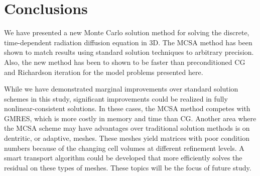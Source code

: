 \documentclass[preprint,12pt]{elsarticle}
\begin{document}
\section{Conclusions}
\label{sec:conclusions}

We have presented a new Monte Carlo solution method for solving the
discrete, time-dependent radiation diffusion equation in 3D.  The MCSA
method has been shown to match results using standard solution
techniques to arbitrary precision.  Also, the new method has been to
shown to be faster than preconditioned CG and Richardson iteration for
the model problems presented here.

While we have demonstrated marginal improvements over standard
solution schemes in this study, significant improvements could be
realized in fully nonlinear-consistent solutions.  In these cases, the
MCSA method competes with GMRES, which is more costly in memory and
time than CG.  Another area where the MCSA scheme may have advantages
over traditional solution methods is on dentritic, or adaptive,
meshes.  These meshes yield matrices with poor condition numbers
because of the changing cell volumes at different refinement levels.
A smart transport algorithm could be developed that more efficiently
solves the residual on these types of meshes.  These topics will be
the focus of future study.














\end{document}
